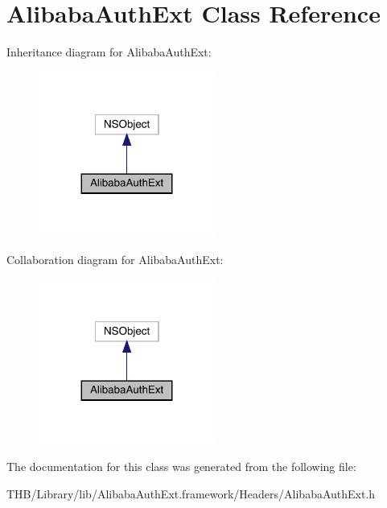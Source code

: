 \hypertarget{interface_alibaba_auth_ext}{}\section{Alibaba\+Auth\+Ext Class Reference}
\label{interface_alibaba_auth_ext}


Inheritance diagram for Alibaba\+Auth\+Ext\+:\nopagebreak
\begin{figure}[H]
\begin{center}
\leavevmode
\includegraphics[width=164pt]{interface_alibaba_auth_ext__inherit__graph}
\end{center}
\end{figure}


Collaboration diagram for Alibaba\+Auth\+Ext\+:\nopagebreak
\begin{figure}[H]
\begin{center}
\leavevmode
\includegraphics[width=164pt]{interface_alibaba_auth_ext__coll__graph}
\end{center}
\end{figure}


The documentation for this class was generated from the following file\+:\begin{DoxyCompactItemize}
\item 
T\+H\+B/\+Library/lib/\+Alibaba\+Auth\+Ext.\+framework/\+Headers/Alibaba\+Auth\+Ext.\+h\end{DoxyCompactItemize}
